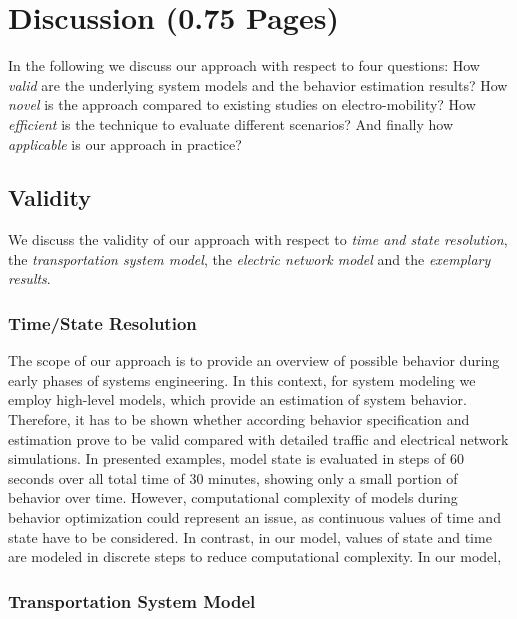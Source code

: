 \section{Discussion (0.75 Pages)}
\label{section:discussion}

In the following we discuss our approach with respect to four questions: How \textit{valid} are the underlying system models and the behavior estimation results? How \textit{novel} is the approach compared to existing studies on electro-mobility? How \textit{efficient} is the technique to evaluate different scenarios? And finally how \textit{applicable} is our approach in practice?

\subsection{Validity}

We discuss the validity of our approach with respect to \textit{time and state resolution}, the \textit{transportation system model}, the \textit{electric network model} and the \textit{exemplary results}.

\subsubsection{Time/State Resolution}

The scope of our approach is to provide an overview of possible behavior during early phases of systems engineering. In this context, for system modeling we employ high-level models, which provide an estimation of system behavior. Therefore, it has to be shown whether according behavior specification and estimation prove to be valid compared with detailed traffic and electrical network simulations. In presented examples, model state is evaluated in steps of 60 seconds over all total time of 30 minutes, showing only a small portion of behavior over time. However, computational complexity of models during behavior optimization could represent an issue, as continuous values of time and state have to be considered. In contrast, in our model, values of state and time are modeled in discrete steps to reduce computational complexity. In our model, 

\subsubsection{Transportation System Model}

